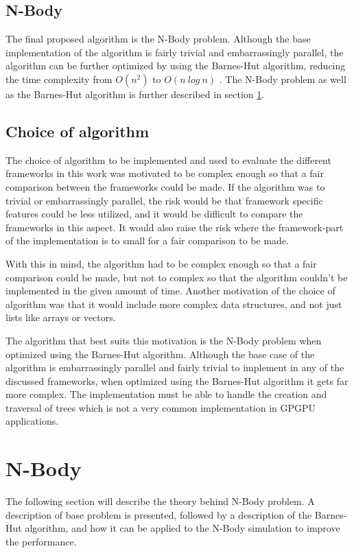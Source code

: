 \subsection{N-Body} \label{subsec:TheoryNBody}

The final proposed algorithm is the N-Body problem. Although the base implementation of the algorithm is fairly trivial and embarrassingly parallel, the algorithm can be further optimized by using the Barnes-Hut algorithm, reducing the time complexity from $O(n^2)$ to $O(n \ log \ n)$ \cite{barnes1986hierarchical}.  The N-Body problem as well as the Barnes-Hut algorithm is further described in section \ref{sec:NBodyTheory}.

\subsection{Choice of algorithm}

The choice of algorithm to be implemented and used to evaluate the different frameworks in this work was motivated to be complex enough so that a fair comparison between the frameworks could be made. If the algorithm was to trivial or embarrassingly parallel, the risk would be that framework specific features could be less utilized, and it would be difficult to compare the frameworks in this aspect. It would also raise the risk where the framework-part of the implementation is to small for a fair comparison to be made. 

With this in mind, the algorithm had to be complex enough so that a fair comparison could be made, but not to complex so that the algorithm couldn't be implemented in the given amount of time. Another motivation of the choice of algorithm was that it would include more complex data structures, and not just lists like arrays or vectors. 

The algorithm that best suits this motivation is the N-Body problem when optimized using the Barnes-Hut algorithm. Although the base case of the algorithm is embarrassingly parallel and fairly trivial to implement in any of the discussed frameworks, when optimized using the Barnes-Hut algorithm it gets far more complex. The implementation must be able to handle the creation and traversal of trees which is not a very common implementation in GPGPU applications.




\section{N-Body} \label{sec:NBodyTheory}
The following section will describe the theory behind N-Body problem. A description of base problem is presented, followed by a description of the Barnes-Hut algorithm, and how it can be applied to the N-Body simulation to improve the performance.

